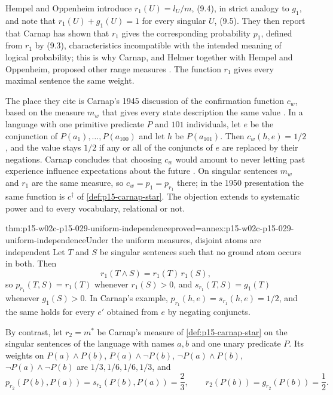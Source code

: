Hempel and Oppenheim introduce \(r_1(U)=l_U/m\), (9.4), in strict
analogy to \(g_1\), and note that \(r_1(U)+g_1(U)=1\) for every singular
\(U\), (9.5). They then report that Carnap has shown that \(r_1\) gives
the corresponding probability \(p_1\), defined from \(r_1\) by (9.3),
characteristics incompatible with the intended meaning of logical
probability; this is why Carnap, and Helmer together with Hempel and
Oppenheim, proposed other range measures
\cite[p.~170, n.~39]{HempelOppenheim1948Explanation}. The function
\(r_1\) gives every maximal sentence the same weight.

The place they cite is Carnap's 1945 discussion of the confirmation
function \(c_w\), based on the measure \(m_w\) that gives every state
description the same value \cite[pp.~80--81, (6)]{Carnap1945InductiveLogic}.
In a language with one primitive predicate \(P\) and \(101\) individuals,
let \(e\) be the conjunction of \(P(a_1),\ldots,P(a_{100})\) and let
\(h\) be \(P(a_{101})\). Then \(c_w(h,e)=1/2\), and the value stays
\(1/2\) if any or all of the conjuncts of \(e\) are replaced by their
negations. Carnap concludes that choosing \(c_w\) would amount to never
letting past experience influence expectations about the future
\cite[p.~81]{Carnap1945InductiveLogic}. On singular sentences \(m_w\) and
\(r_1\) are the same measure, so \(c_w=p_1=p_{r_1}\) there; in the 1950
presentation the same function is \(c^\dagger\) of
\cref{def:p15-carnap-star}. The objection extends to systematic power and
to every vocabulary, relational or not.

\begin{hbtheorem}{thm:p15-w02c-p15-029-uniform-independence}{proved=annex:p15-w02c-p15-029-uniform-independence}{Under the uniform measures, disjoint atoms are independent}
Let \(T\) and \(S\) be singular sentences such that no ground atom occurs
in both. Then
\[
 r_1(T\land S)=r_1(T)\,r_1(S),
\]
so \(p_{r_1}(T,S)=r_1(T)\) whenever \(r_1(S)>0\), and
\(s_{r_1}(T,S)=g_1(T)\) whenever \(g_1(S)>0\). In Carnap's example,
\(p_{r_1}(h,e)=s_{r_1}(h,e)=1/2\), and the same holds for every \(e'\)
obtained from \(e\) by negating conjuncts.

By contrast, let \(r_2=m^\ast\) be Carnap's measure of
\cref{def:p15-carnap-star} on the singular sentences of the language
with names \(a,b\) and one unary predicate \(P\). Its weights on
\(P(a)\land P(b)\), \(P(a)\land\neg P(b)\), \(\neg P(a)\land P(b)\),
\(\neg P(a)\land\neg P(b)\) are \(1/3,1/6,1/6,1/3\), and
\[
 p_{r_2}(P(b),P(a))=s_{r_2}(P(b),P(a))=\frac23,
 \qquad
 r_2(P(b))=g_{r_2}(P(b))=\frac12 .
\]
\end{hbtheorem}

